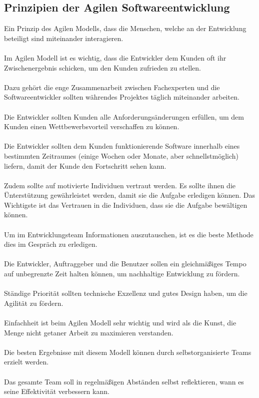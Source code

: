 \documentclass[a4paper, 10pt]{scrartcl}
\begin{document}
\subsection{Prinzipien der Agilen Softwareentwicklung}
Ein Prinzip des Agilen Modells, dass die Menschen, welche an der Entwicklung beteiligt sind miteinander interagieren.\\\\
Im Agilen Modell ist es wichtig, dass die Entwickler dem Kunden oft ihr Zwischenergebnis schicken, um den Kunden zufrieden zu stellen.\\\\
Dazu gehört die enge Zusammenarbeit zwischen Fachexperten und die Softwareentwickler sollten währendes Projektes täglich miteinander arbeiten.\\\\
Die Entwickler sollten Kunden alle Anforderungsänderungen erfüllen, um dem Kunden einen Wettbewerbsvorteil verschaffen zu können.\\\\
Die Entwickler sollten dem Kunden funktionierende Software innerhalb eines bestimmten Zeitraumes (einige Wochen oder Monate, aber schnellstmöglich) liefern, damit der Kunde den Fortschritt sehen kann.\\\\
Zudem sollte auf motivierte Individuen vertraut werden. Es sollte ihnen die Ünterstützung gewährleistet werden, damit sie die Aufgabe erledigen können. Das Wichtigste ist das Vertrauen in die Individuen, dass sie die Aufgabe bewältigen können.\\\\
Um im Entwicklungsteam Informationen auszutauschen, ist es die beste Methode dies im Gespräch zu erledigen.\\\\
Die Entwickler, Auftraggeber und die Benutzer sollen ein gleichmäßiges Tempo auf unbegrenzte Zeit halten können, um nachhaltige Entwicklung zu fördern.\\\\
Ständige Priorität sollten technische Exzellenz und gutes Design haben, um die Agilität zu fördern.\\\\
Einfachheit ist beim Agilen Modell sehr wichtig und wird als \glqq{}die Kunst, die Menge nicht
getaner Arbeit zu maximieren\grqq{}\cite{Beck2013} verstanden.\\\\
Die besten Ergebnisse mit diesem Modell können durch selbstorganisierte Teams erzielt werden.\\\\
Das gesamte Team soll in regelmäßigen Abständen selbst reflektieren, wann es seine Effektivität verbessern kann. \citep{Beck2013}
\end{document}

